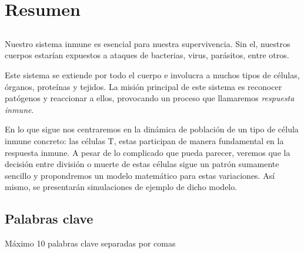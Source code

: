 \chapter*{Resumen}

\section*{\tituloPortadaVal}

Nuestro sistema inmune es esencial para nuestra supervivencia. Sin el, nuestros cuerpos estarían expuestos a ataques de bacterias, virus, parásitos, entre otros. 

Este sistema se extiende por todo el cuerpo e involucra a muchos tipos de células, órganos, proteínas y tejidos. La misión principal de este sistema es reconocer patógenos y reaccionar a ellos, provocando un proceso que llamaremos \textit{respuesta inmune}. 

En lo que sigue nos centraremos en la dinámica de población de un tipo de célula inmune concreto: las células T, estas participan de manera fundamental en la respuesta inmune. A pesar de lo complicado que pueda parecer, veremos que la decisión entre división o muerte de estas células sigue un patrón sumamente sencillo y propondremos un modelo matemático para estas variaciones. Así mismo, se presentarán simulaciones de ejemplo de dicho modelo. 

\section*{Palabras clave}
   
\noindent Máximo 10 palabras clave separadas por comas

   



